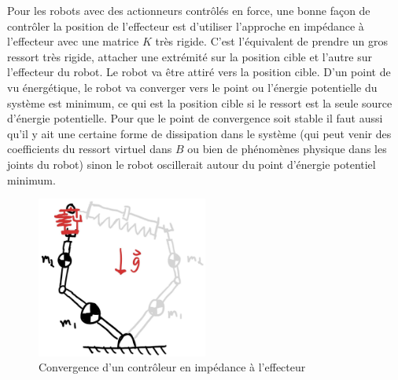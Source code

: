 Pour les robots avec des actionneurs contrôlés en force, une bonne façon de contrôler la position de l'effecteur est d'utiliser l'approche en impédance à l'effecteur avec une matrice $K$ très rigide. C'est l'équivalent de prendre un gros ressort très rigide, attacher une extrémité sur la position cible et l'autre sur l'effecteur du robot. Le robot va être attiré vers la position cible. D'un point de vu énergétique, le robot va converger vers le point ou l'énergie potentielle du système est minimum, ce qui est la position cible si le ressort est la seule source d'énergie potentielle. Pour que le point de convergence soit stable il faut aussi qu'il y ait une certaine forme de dissipation dans le système (qui peut venir des coefficients du ressort virtuel dans $B$ ou bien de phénomènes physique dans les joints du robot) sinon le robot oscillerait autour du point d'énergie potentiel minimum. 
\begin{figure}[h]
	\centering
		\includegraphics[width=0.5\textwidth]{fig/impedancecontroltaskconvergencegeo.jpg}
	\caption{Convergence d'un contrôleur en impédance à l'effecteur}
	\label{fig:impedancecontroltaskconvergencegeo}
\end{figure}

